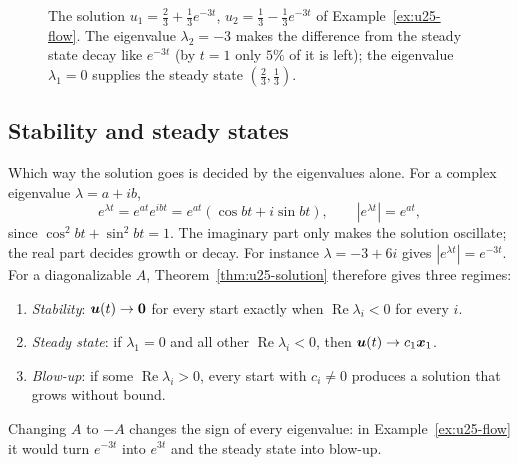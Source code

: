 \begin{figure}[ht]\centering
{}
\caption{The solution $u_1=\tfrac23+\tfrac13e^{-3t}$, $u_2=\tfrac13-\tfrac13e^{-3t}$ of
Example~\ref{ex:u25-flow}. The eigenvalue $\lambda_2=-3$ makes the
difference from the steady state decay like $e^{-3t}$ (by $t=1$ only $5\%$ of it is left);
the eigenvalue $\lambda_1=0$ supplies the steady state $(\tfrac23,\tfrac13)$.}
\label{fig:u25-flow}
\end{figure}

\subsection{Stability and steady states}

Which way the solution goes is decided by the eigenvalues alone. For a complex eigenvalue
$\lambda=a+ib$,
\[
  e^{\lambda t}=e^{at}e^{ibt}=e^{at}(\cos bt+i\sin bt),\qquad |e^{\lambda t}|=e^{at},
\]
since $\cos^{2}bt+\sin^{2}bt=1$. The imaginary part only makes the solution oscillate; the
real part decides growth or decay. For instance $\lambda=-3+6i$ gives $|e^{\lambda t}|=e^{-3t}$.
For a diagonalizable $A$, Theorem~\ref{thm:u25-solution} therefore gives three regimes:
\begin{enumerate}
  \item \emph{Stability}: $\boldsymbol{u}(t)\to\boldsymbol{0}$ for every start exactly when
  $\operatorname{Re}\lambda_i<0$ for every $i$.
  \item \emph{Steady state}: if $\lambda_1=0$ and all other $\operatorname{Re}\lambda_i<0$,
  then $\boldsymbol{u}(t)\to c_1\boldsymbol{x}_1$.
  \item \emph{Blow-up}: if some $\operatorname{Re}\lambda_i>0$, every start with $c_i\neq0$
  produces a solution that grows without bound.
\end{enumerate}
Changing $A$ to $-A$ changes the sign of every eigenvalue: in Example~\ref{ex:u25-flow} it
would turn $e^{-3t}$ into $e^{3t}$ and the steady state into blow-up.

